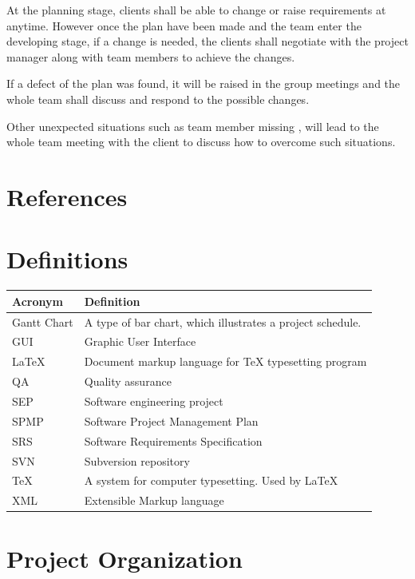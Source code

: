 \documentclass[11pt, a4paper]{report}
\begin{document}
At the planning stage, clients shall be able to change or raise requirements at anytime. However once the plan have been made and the team enter the developing stage, if a change is needed, the clients shall negotiate with the project manager along with team members to achieve the changes. 

If a defect of the plan was found, it will be raised in the group meetings and the whole team shall discuss and respond to the possible changes.

Other unexpected situations such as team member missing , will lead to the whole team meeting with the client to discuss how to overcome such situations. 


\pagebreak


\chapter{References}

\pagebreak


\chapter{Definitions}
\begin{tabular}{| l | l | }
\hline
Acronym      		&	Definition       											\\ \hline
Gantt Chart      	& 	A type of bar chart, which illustrates a project schedule.	\\ \hline
GUI					& 	Graphic User Interface 										\\ \hline
{\LaTeX}			&	Document markup language for {\TeX} typesetting program 	\\ \hline
QA 					&	Quality assurance 											\\ \hline
SEP					&	Software engineering project								\\ \hline
SPMP				&	Software Project Management Plan							\\ \hline
SRS					&	Software Requirements Specification							\\ \hline
SVN					&	Subversion repository										\\ \hline
{\TeX} 				&	A system for computer typesetting. Used by {\LaTeX}			\\ \hline
XML					& 	Extensible Markup language 									\\ \hline
\end{tabular}

\pagebreak


\chapter{Project Organization}
\end{document}
